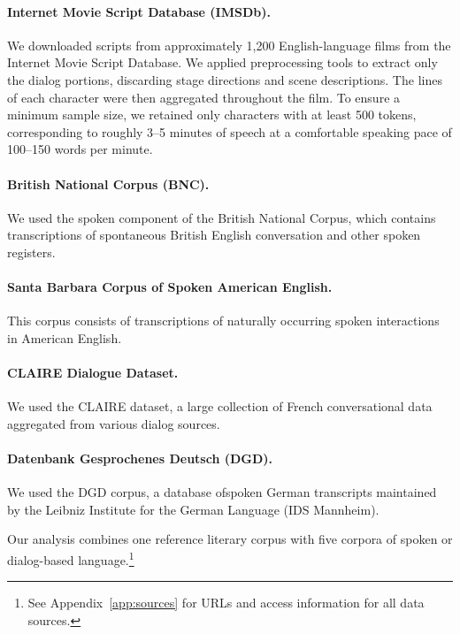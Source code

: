 ﻿\documentclass{article}
\begin{document}
\paragraph{Internet Movie Script Database (IMSDb).} 
We downloaded scripts from approximately 1,200 English-language films from the Internet Movie Script Database. We applied preprocessing tools to extract only the dialog portions, discarding stage directions and scene descriptions. The lines of each character were then aggregated throughout the film. To ensure a minimum sample size, we retained only characters with at least 500 tokens, corresponding to roughly 3--5 minutes of speech at a comfortable speaking pace of 100--150 words per minute.

\paragraph{British National Corpus (BNC).} 
We used the spoken component of the British National Corpus, which contains transcriptions of spontaneous British English conversation and other spoken registers.

\paragraph{Santa Barbara Corpus of Spoken American English.} 
This corpus consists of transcriptions of naturally occurring spoken interactions in American English.

\paragraph{CLAIRE Dialogue Dataset.}
We used the CLAIRE dataset, a large collection of French conversational data aggregated from various dialog sources.

\paragraph{Datenbank Gesprochenes Deutsch (DGD).}
We used the DGD corpus, a database ofspoken German transcripts maintained by the Leibniz Institute for the German Language (IDS Mannheim).

\vspace{1em}

Our analysis combines one reference literary corpus with five corpora of spoken or dialog-based language.\footnote{See Appendix~\ref{app:sources} for URLs and access information for all data sources.}
\end{document}
